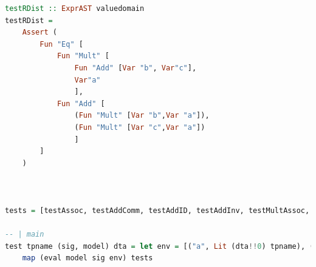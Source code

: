 \documentclass{article}
\begin{document}
\begin{lstlisting}[language=Haskell]
testRDist :: ExprAST valuedomain
testRDist =  
    Assert ( 
        Fun "Eq" [
            Fun "Mult" [
                Fun "Add" [Var "b", Var"c"], 
                Var"a"
                ], 
            Fun "Add" [
                (Fun "Mult" [Var "b",Var "a"]),
                (Fun "Mult" [Var "c",Var "a"])
                ] 
        ]
    )



tests = [testAssoc, testAddComm, testAddID, testAddInv, testMultAssoc, testMultID, testLDist, testRDist]

-- | main
test tpname (sig, model) dta = let env = [("a", Lit (dta!!0) tpname), ("b", Lit (dta!!1) tpname), ("c", Lit (dta!!2) tpname), ("multConst", Lit (dta!!3) tpname), ("addConst", Lit (dta!!2) tpname)] in
    map (eval model sig env) tests
    \end{lstlisting}
\end{document}
